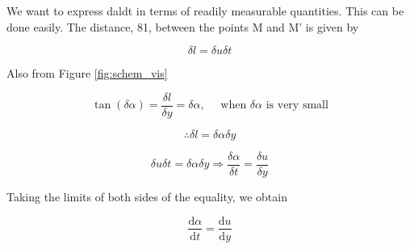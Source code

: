 \documentclass{article}
\begin{document}
We want to express daldt in terms of readily measurable quantities. This can be done easily. The distance, 81, between the points M and M' is given by

$$\delta l = \delta u\delta t$$

Also from Figure \ref{fig:schem_vis} 

$$\tan(\delta \alpha) = \frac{\delta l}{\delta y} = \delta \alpha, \quad \text{ when } \delta \alpha \text{ is very small}$$ 

$$\therefore \delta l = \delta\alpha \delta y$$

$$\delta u \delta t = \delta \alpha \delta y \Rightarrow \frac{\delta\alpha}{\delta t} = \frac{\delta u}{\delta y}$$

Taking the limits of both sides of the equality, we obtain

$$\frac{\text{d}\alpha}{\text{d}t} = \frac{\text{d}u}{\text{d}y}$$
\end{document}
